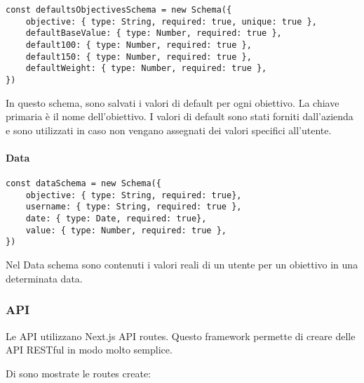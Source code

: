 \begin{verbatim}
const defaultsObjectivesSchema = new Schema({
    objective: { type: String, required: true, unique: true },
    defaultBaseValue: { type: Number, required: true },
    default100: { type: Number, required: true },
    default150: { type: Number, required: true },
    defaultWeight: { type: Number, required: true },
})
\end{verbatim}

In questo schema, sono salvati i valori di default per ogni obiettivo. La chiave primaria è il nome dell'obiettivo.
I valori di default sono stati forniti dall'azienda e sono utilizzati in caso non vengano assegnati dei valori 
specifici all'utente.

\paragraph{Data}

\begin{verbatim}
const dataSchema = new Schema({
    objective: { type: String, required: true},
    username: { type: String, required: true },
    date: { type: Date, required: true},
    value: { type: Number, required: true },
})
\end{verbatim}

Nel Data schema sono contenuti i valori reali di un utente per un obiettivo in una determinata data.

\subsubsection{API}

Le API utilizzano Next.js API routes. Questo framework permette di creare delle API RESTful in modo molto semplice.

Di sono mostrate le routes create:


